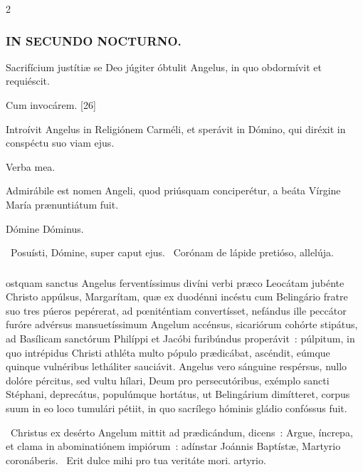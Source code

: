 \documentclass[9pt,twoside]{extarticle}
\begin{document}
\begin{multicols}{2}
\subsubsection*{\center \textsc{IN SECUNDO NOCTURNO.}}
\begin{tightlist}{}
\item {} Sacrifícium justítiæ se Deo júgiter óbtulit Angelus, in quo obdormívit et requiéscit.
\item {} Cum invocárem. [26]
\item {} Introívit Angelus in Religiónem Carméli, et sperávit in Dómino, qui diréxit in conspéctu suo viam ejus.
\item {} Verba mea.
\item {} Admirábile est nomen Angeli, quod priúsquam conciperétur, a beáta Vírgine María prænuntiátum fuit.
\item {} Dómine Dóminus.
\item {}~Posuísti, Dómine, super caput ejus. ~Corónam de lápide pretióso, allelúja.
\end{tightlist}

\subsubsection*{\center {}}
ostquam sanctus Angelus ferventíssimus divíni verbi præco Leocátam jubénte Christo appúlsus, Margarítam, quæ ex duodénni incéstu cum Belingário fratre suo tres púeros pepérerat, ad pœniténtiam convertísset, nefándus ille peccátor furóre advérsus mansuetíssimum Angelum accénsus, sicariórum cohórte stipátus, ad Basílicam sanctórum Philíppi et Jacóbi furibúndus properávit~: púlpitum, in quo intrépidus Christi athléta multo pópulo prædicábat, ascéndit, eúmque quinque vulnéribus letháliter sauciávit. Angelus vero sánguine respérsus, nullo dolóre pércitus, sed vultu hílari, Deum pro persecutóribus, exémplo sancti Stéphani, deprecátus, populúmque hortátus, ut Belingárium dimítteret, corpus suum in eo loco tumulári pétiit, in quo sacrílego hóminis gládio confóssus fuit.

\begin{tightlist}{}
\item {}~Christus ex desérto Angelum mittit ad prædicándum, dicens~: Argue, íncrepa, et clama in abominatiónem impiórum~: adínstar Joánnis Baptístæ, \textred{*} Martyrio coronáberis.
~Erit dulce mihi pro tua veritáte mori. artyrio.
\end{tightlist}


\end{multicols}
\end{document}
